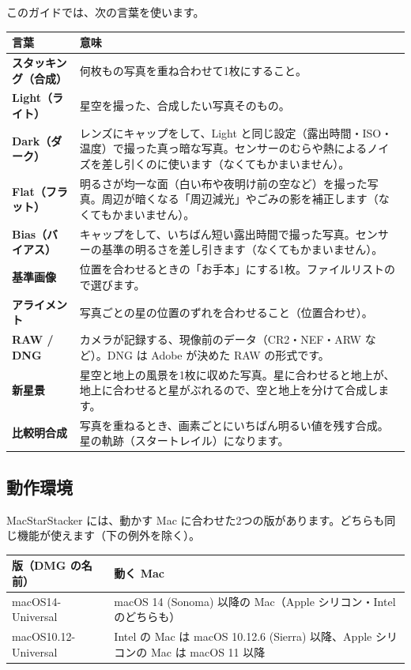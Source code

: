 このガイドでは、次の言葉を使います。

\begin{center}
\small
\begin{tabularx}{\linewidth}{>{\bfseries}l X}
\toprule
言葉 & 意味 \\
\midrule
スタッキング（合成） & 何枚もの写真を重ね合わせて1枚にすること。 \\
Light（ライト） & 星空を撮った、合成したい写真そのもの。 \\
Dark（ダーク） & レンズにキャップをして、Light と同じ設定（露出時間・ISO・温度）で撮った真っ暗な写真。センサーのむらや熱によるノイズを差し引くのに使います（なくてもかまいません）。 \\
Flat（フラット） & 明るさが均一な面（白い布や夜明け前の空など）を撮った写真。周辺が暗くなる「周辺減光」やごみの影を補正します（なくてもかまいません）。 \\
Bias（バイアス） & キャップをして、いちばん短い露出時間で撮った写真。センサーの基準の明るさを差し引きます（なくてもかまいません）。 \\
基準画像 & 位置を合わせるときの「お手本」にする1枚。ファイルリストの\ui{★}で選びます。 \\
アライメント & 写真ごとの星の位置のずれを合わせること（位置合わせ）。 \\
RAW / DNG & カメラが記録する、現像前のデータ（CR2・NEF・ARW など）。DNG は Adobe が決めた RAW の形式です。 \\
新星景 & 星空と地上の風景を1枚に収めた写真。星に合わせると地上が、地上に合わせると星がぶれるので、空と地上を分けて合成します。 \\
比較明合成 & 写真を重ねるとき、画素ごとにいちばん明るい値を残す合成。星の軌跡（スタートレイル）になります。 \\
\bottomrule
\end{tabularx}
\end{center}

\subsection{動作環境}\label{sec:requirements}

MacStarStacker には、動かす Mac に合わせた2つの版があります。どちらも同じ機能が使えます（下の例外を除く）。

\begin{center}
\small
\begin{tabularx}{\linewidth}{l X}
\toprule
版（DMG の名前） & 動く Mac \\
\midrule
\textsf{macOS14-Universal} & macOS 14 (Sonoma) 以降の Mac（Apple シリコン・Intel のどちらも） \\
\textsf{macOS10.12-Universal} & Intel の Mac は macOS 10.12.6 (Sierra) 以降、Apple シリコンの Mac は macOS 11 以降 \\
\bottomrule
\end{tabularx}
\end{center}

